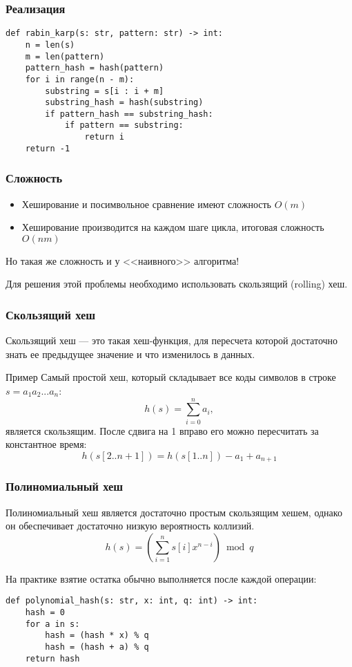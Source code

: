 \documentclass[aspectratio=169]{beamer}
\begin{document}
\begin{frame}[fragile]
    \frametitle{Реализация}
    \begin{verbatim}
def rabin_karp(s: str, pattern: str) -> int:
    n = len(s)
    m = len(pattern)
    pattern_hash = hash(pattern)
    for i in range(n - m):
        substring = s[i : i + m]
        substring_hash = hash(substring)
        if pattern_hash == substring_hash:
            if pattern == substring:
                return i
    return -1
    \end{verbatim}
\end{frame}

\begin{frame}
    \frametitle{Сложность}
    \begin{itemize}
        \item Хеширование и посимвольное сравнение имеют сложность $O(m)$
        \item Хеширование производится на каждом шаге цикла, итоговая сложность $O(nm)$
    \end{itemize}
    Но такая же сложность и у <<наивного>> алгоритма!

    Для решения этой проблемы необходимо использовать скользящий (rolling) хеш.
\end{frame}

\begin{frame}
    \frametitle{Скользящий хеш}
    Скользящий хеш --- это такая хеш-функция, для пересчета которой достаточно знать
    ее предыдущее значение и что изменилось в данных.

    \begin{exampleblock}{Пример}
        Самый простой хеш, который складывает все коды символов в строке
        $s = a_1 a_2 ... a_n$: \[h(s) = \sum_{i=0}^n a_i,\] является скользящим.
        После сдвига на 1 вправо его можно пересчитать за константное время:
        \[h(s[2..n+1]) = h(s[1..n]) - a_1 + a_{n+1}\]
    \end{exampleblock}
\end{frame}

\begin{frame}[fragile]
    \frametitle{Полиномиальный хеш}
    Полиномиальный хеш является достаточно простым скользящим хешем,
    однако он обеспечивает достаточно низкую вероятность коллизий.
    \[h(s) = \left(\sum_{i=1}^n s[i]x^{n-i} \right) \bmod{q}\]

    На практике взятие остатка обычно выполняется после каждой операции:
    \begin{verbatim}
def polynomial_hash(s: str, x: int, q: int) -> int:
    hash = 0
    for a in s:
        hash = (hash * x) % q
        hash = (hash + a) % q
    return hash
    \end{verbatim}
\end{frame}
\end{document}
